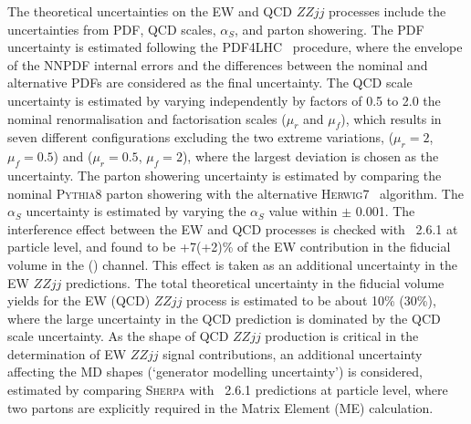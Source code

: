 The theoretical uncertainties on the EW and QCD $ZZjj$ processes include the uncertainties from PDF, QCD scales, $\alpha_{S}$, and parton showering. The PDF uncertainty is estimated following the PDF4LHC~\cite{Butterworth:2015oua} procedure, where the envelope of the NNPDF internal errors and the differences between the nominal and alternative PDFs are considered as the final uncertainty.
The QCD scale uncertainty is estimated by varying independently by factors of 0.5 to 2.0 the nominal renormalisation and factorisation scales ($\mu_r$ and $\mu_f$),
which results in seven different configurations excluding the two extreme variations, ($\mu_r = 2$, $\mu_f = 0.5$) and ($\mu_r = 0.5$, $\mu_f = 2$),
where the largest deviation is chosen as the uncertainty.
The parton showering uncertainty is estimated by comparing the nominal \textsc{Pythia8} parton showering with the alternative \textsc{Herwig7}~\cite{Bellm:2015jjp, Bahr:2008pv} algorithm. The $\alpha_{S}$ uncertainty is estimated by varying the $\alpha_{S}$ value within $\pm$ 0.001. The interference effect between the EW and QCD processes is checked with \MGMCatNLO~2.6.1 at particle level, and found to be +7(+2)\% of the EW contribution in the fiducial volume in the \lllljj (\llvvjj) channel. This effect is taken as an additional uncertainty in the EW $ZZjj$ predictions. The total theoretical uncertainty in the fiducial volume yields for the EW (QCD) $ZZjj$ process is estimated to be about 10\% (30\%), where the large uncertainty in the QCD prediction is dominated by the QCD scale uncertainty.
As the shape of QCD $ZZjj$ production is critical in the determination of EW $ZZjj$ signal contributions,
an additional uncertainty affecting the MD shapes (`generator modelling uncertainty') is considered,
estimated by comparing \textsc{Sherpa} with \MGMCatNLO~2.6.1 predictions at particle level, where two partons are explicitly required in the Matrix Element (ME) calculation.
